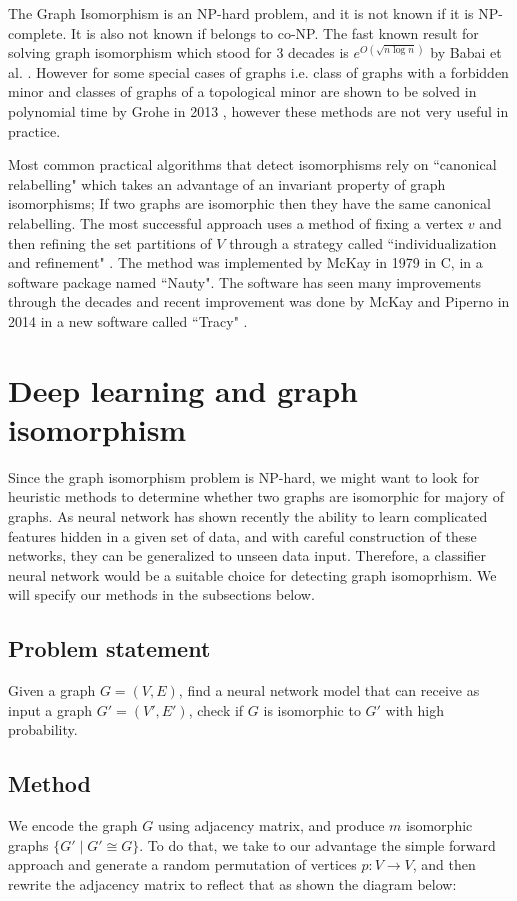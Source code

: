 \documentclass[letterpaper,UKenglish]{lipics-v2018}
\begin{document}
The Graph Isomorphism is an NP-hard problem, and it is not known if it is NP-complete. It is also not known if belongs to co-NP. The fast known result for solving graph isomorphism which stood for 3 decades is $e^{O(\sqrt{n \log n})}$ by Babai et al. \cite{BabaiL83}. However for some special cases of graphs i.e. class of graphs with a forbidden minor and classes of graphs of a topological minor are shown to be solved in polynomial time by Grohe in 2013 \cite{Grohe13}, however these methods are not very useful in practice.

Most common practical algorithms that detect isomorphisms rely on ``canonical relabelling" which takes an advantage of an invariant property of graph isomorphisms; If two graphs are isomorphic then they have the same canonical relabelling. The most successful approach uses a method of fixing a vertex $v$ and then refining the set partitions of $V$ through a strategy called ``individualization and refinement" \cite{parris1969coding}. The method was implemented by McKay in 1979 in C, in a software package named ``Nauty". The software has seen many improvements through the decades and recent improvement was done by 
McKay and Piperno in 2014 in a new software called ``Tracy" \cite{mckay2014practical}.

\section{Deep learning and graph isomorphism}
Since the graph isomorphism problem is NP-hard, we might want to look for heuristic methods to determine whether two graphs are isomorphic for majory of graphs. As neural network has shown recently the ability to learn complicated features hidden in a given set of data, and with careful construction of these networks, they can be generalized to unseen data input. Therefore, a classifier neural network would be a suitable choice for detecting graph isomoprhism. We will specify our methods in the subsections below.

\subsection{Problem statement}
Given a graph $G = (V,E)$, find a neural network model that can receive as input a graph $G' = (V',E')$, check if $G$ is isomorphic to $G'$ with high probability.  

\subsection{Method}
We encode the graph $G$ using adjacency matrix, and produce $m$ isomorphic graphs $\{ G' \mid G' \cong G \}$. To do that, we take to our advantage the simple forward approach and generate a random permutation of vertices $p \colon V\to V$, and then rewrite the adjacency matrix to reflect that as shown the diagram below:
\end{document}
